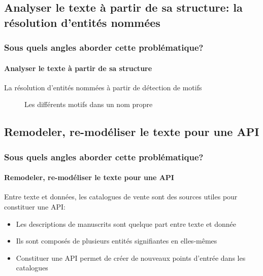 \documentclass{beamer}
\begin{document}
\subsection{Analyser le texte à partir de sa structure: la résolution d'entités nommées}
\begin{frame}
	\frametitle{Sous quels angles aborder cette problématique?}
	\framesubtitle{Analyser le texte à partir de sa structure}
	
	La résolution d'entités nommées à partir de détection de motifs
	\begin{figure}[h!]
		\centering
		\caption{Les différents motifs dans un nom propre}
		\label{code:prepin_teiname_part}
	\end{figure}
\end{frame}

\subsection{Remodeler, re-modéliser le texte pour une API}
\begin{frame}
	\frametitle{Sous quels angles aborder cette problématique?}
	\framesubtitle{Remodeler, re-modéliser le texte pour une API}
	
	Entre texte et données, les catalogues de vente sont des sources utiles pour constituer une API:
	\begin{itemize}
		\item Les descriptions de manuscrits sont quelque part entre texte et donnée
		\item Ils sont composés de plusieurs entités signifiantes en elles-mêmes
		\item Constituer une API permet de créer de nouveaux points d'entrée dans les catalogues
	\end{itemize}
\end{frame}
\end{document}
